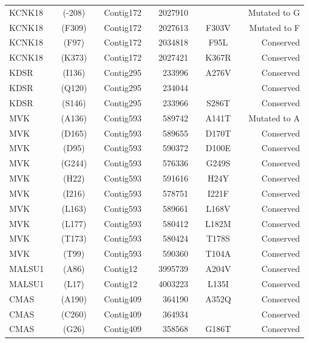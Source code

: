 \begin{center}
\begin{longtable}{lccclcrcccr}
KCNK18   & & (-208)  & & Contig172  & & 2027910  & &         & & Mutated to G   \\
KCNK18   & & (F309)  & & Contig172  & & 2027613  & & F303V   & & Mutated to F   \\
KCNK18   & & (F97)   & & Contig172  & & 2034818  & & F95L    & & Conserved      \\
KCNK18   & & (K373)  & & Contig172  & & 2027421  & & K367R   & & Conserved      \\
KDSR     & & (I136)  & & Contig295  & & 233996   & & A276V   & & Conserved      \\
KDSR     & & (Q120)  & & Contig295  & & 234044   & &         & & Conserved      \\
KDSR     & & (S146)  & & Contig295  & & 233966   & & S286T   & & Conserved      \\
MVK      & & (A136)  & & Contig593  & & 589742   & & A141T   & & Mutated to A   \\
MVK      & & (D165)  & & Contig593  & & 589655   & & D170T   & & Conserved      \\
MVK      & & (D95)   & & Contig593  & & 590372   & & D100E   & & Conserved      \\
MVK      & & (G244)  & & Contig593  & & 576336   & & G249S   & & Conserved      \\
MVK      & & (H22)   & & Contig593  & & 591616   & & H24Y    & & Conserved      \\
MVK      & & (I216)  & & Contig593  & & 578751   & & I221F   & & Conserved      \\
MVK      & & (L163)  & & Contig593  & & 589661   & & L168V   & & Conserved      \\
MVK      & & (L177)  & & Contig593  & & 580412   & & L182M   & & Conserved      \\
MVK      & & (T173)  & & Contig593  & & 580424   & & T178S   & & Conserved      \\
MVK      & & (T99)   & & Contig593  & & 590360   & & T104A   & & Conserved      \\
MALSU1   & & (A86)   & & Contig12   & & 3995739  & & A204V   & & Conserved      \\
MALSU1   & & (L17)   & & Contig12   & & 4003223  & & L135I   & & Conserved      \\
CMAS     & & (A190)  & & Contig409  & & 364190   & & A352Q   & & Conserved      \\
CMAS     & & (C260)  & & Contig409  & & 364934   & &         & & Conserved      \\
CMAS     & & (G26)   & & Contig409  & & 358568   & & G186T   & & Conserved      \\

\end{longtable}
\end{center}
